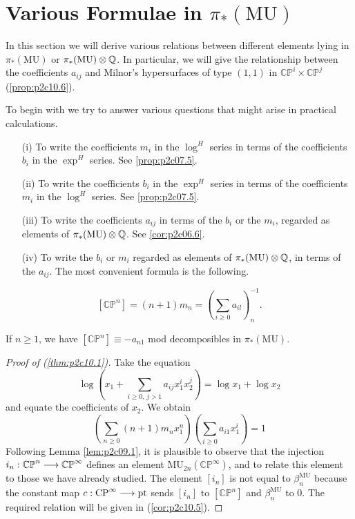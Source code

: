 \documentclass[../main]{subfiles}
\begin{document}
\label{sec:p2c10}
\chapter{Various Formulae in $\pi_\ast(\mathrm{MU})$}
In this section we will derive various relations between different elements lying in $\pi_\ast(\mathrm{MU})$ or $\pi_\ast(\mathrm{MU}) \otimes \mathbb{Q}$. In particular, we will give the relationship between the coefficients $a_{ij}$ and Milnor's hypersurfaces of type $(1,1)$ in $\mathbb {CP}^i \times \mathbb {CP}^j$ (\ref{prop:p2c10.6}).

To begin with we try to answer various questions that might arise in practical calculations.

\begin{enumerate}
    \item[(i)] To write the coefficients $m_i$ in the $\log^H$ series in terms of the coefficients $b_i$ in the $\exp^H$ series. See \ref{prop:p2c07.5}.
    \item[(ii)] To write the coefficients $b_i$ in the $\exp^H$ series in terms of the coefficients $m_i$ in the $\log^H$ series. See \ref{prop:p2c07.5}.
    \item[(iii)] To write the coefficients $a_{ij}$ in terms of the $b_i$ or the $m_i$, regarded as elements of $\pi_\ast(\mathrm{MU}) \otimes \mathbb{Q}$. See \eqref{cor:p2c06.6}.
    \item[(iv)] To write the $b_i$ or $m_i$ regarded as elements of $\pi_\ast(\mathrm {MU}) \otimes \mathbb{Q}$, in terms of the $a_{ij}$. The most convenient formula is the following. 
\end{enumerate}

\begin{theorem}
\label{thm:p2c10.1}
\begin{equation}
        \tag{10.1}
        [\mathbb {CP}^n] = (n + 1)m_n = \left(\sum_{i \ge 0} a_{il}\right)_n^{-1}.
\end{equation}
\end{theorem}

\begin{corollary}
\label{cor:p2c10.2}
If $n \ge 1$, we have $[\mathbb {CP}^n] \equiv -a_{n1}$ mod decomposibles in $\pi_\ast(\mathrm{MU})$.
\end{corollary}

\begin{proof}[Proof of (\ref{thm:p2c10.1})]
Take the equation $$\log \left(x_1 + \sum_{i \ge 0, \, j > 1} a_{ij} x_1^i x_2^j\right) = \log x_1 + \log x_2$$ and equate the coefficients of $x_2$. We obtain $$\left(\sum_{n \ge 0} (n + 1) m_n x_1^n\right) \left(\sum_{i \ge 0} a_{i1} x_1^i\right) = 1$$ Following Lemma \ref{lem:p2c09.1}, it is plausible to observe that the injection $i_n : \mathbb {CP}^n \overset{}{\longrightarrow} \mathbb {CP}^\infty$ defines an element $\mathrm {MU}_{2n} (\mathbb {CP}^\infty)$, and to relate this element to those we have already studied. The element $[i_n]$ is not equal to $\beta_n^{\mathrm{MU}}$ because the constant map $c : \mathrm{CP}^\infty \overset{}{\longrightarrow} \mathrm{pt}$ sends $[i_n]$ to $[\mathbb {CP}^n]$ and $\beta_n^{\mathrm{MU}}$ to $0$. The required relation will be given in (\ref{cor:p2c10.5}).
\end{proof}
\end{document}
